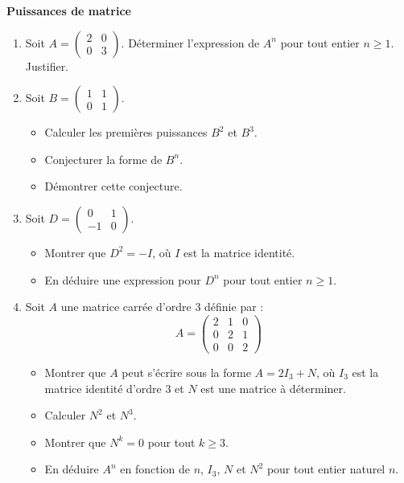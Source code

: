 \documentclass[10pt,a4paper]{article}
\begin{document}
\textbf{Puissances de matrice}
\begin{enumerate}
    \item Soit $A = \begin{pmatrix} 2 & 0 \\ 0 & 3 \end{pmatrix}$. Déterminer l'expression de $A^n$ pour tout entier $n \geq 1$. Justifier.
    \item Soit $B = \begin{pmatrix} 1 & 1 \\ 0 & 1 \end{pmatrix}$.
    \begin{itemize}
        \item Calculer les premières puissances $B^2$ et $B^3$.
        \item Conjecturer la forme de $B^n$.
        \item Démontrer cette conjecture.
    \end{itemize}
    \item Soit $D = \begin{pmatrix} 0 & 1 \\ -1 & 0 \end{pmatrix}$.
    \begin{itemize}
        \item Montrer que $D^2 = -I$, où $I$ est la matrice identité.
        \item En déduire une expression pour $D^n$ pour tout entier $n \geq 1$.
    \end{itemize}
    \item Soit $A$ une matrice carrée d'ordre 3 définie par :
    $$
    A = \begin{pmatrix}
    2 & 1 & 0 \\
    0 & 2 & 1 \\
    0 & 0 & 2
    \end{pmatrix}
    $$
    \begin{itemize}
        \item Montrer que $A$ peut s'écrire sous la forme $A = 2I_3 + N$, où $I_3$ est la matrice identité d'ordre 3 et $N$ est une matrice à déterminer.
        \item Calculer $N^2$ et $N^3$.
        \item Montrer que $N^k = 0$ pour tout $k \geq 3$.
        \item En déduire $A^n$ en fonction de $n$, $I_3$, $N$ et $N^2$ pour tout entier naturel $n$.
    \end{itemize}
\end{enumerate}
\end{document}
